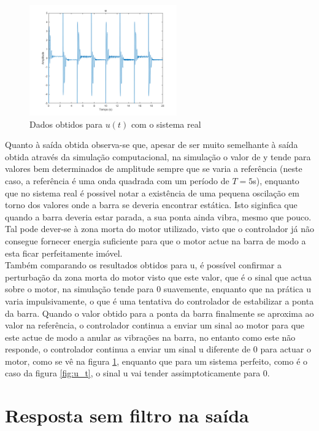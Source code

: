 \documentclass[%
  reprint,
  nofootinbib,
  amsmath,amssymb,
  aps,
  10pt,
  a4paper
]{revtex4-1}
\begin{document}
\begin{figure}[t]
\includegraphics[width=2.5in]{../img/u_dados_01.png}
\caption{Dados obtidos para $u(t)$ com o sistema real}
\label{fig:u_d}
\end{figure}

Quanto à saída obtida observa-se que, apesar de ser muito semelhante à saída obtida através da simulação computacional, na simulação o valor de y tende para valores bem determinados de amplitude sempre que se varia a referência (neste caso, a referência é uma onda quadrada com um período de $T=5$s), enquanto que no sistema real é possivel notar a existência de uma pequena oscilação em torno dos valores onde a barra se deveria encontrar estática. Isto siginfica que quando a barra deveria estar parada, a sua ponta ainda vibra, mesmo que pouco. Tal pode dever-se à zona morta do motor utilizado, visto que o controlador já não consegue fornecer energia suficiente para que o motor actue na barra de modo a esta ficar perfeitamente imóvel.\\

Também comparando os resultados obtidos para u, é possível confirmar a perturbação da zona morta do motor visto que este valor, que é o sinal que actua sobre o motor,  na simulação tende para 0 suavemente, enquanto que na prática u varia impulsivamente, o que é uma tentativa do controlador de estabilizar a ponta da barra. Quando o valor obtido para a ponta da barra finalmente se aproxima ao valor na referência, o controlador continua a enviar um sinal ao motor para que este actue de modo a anular as vibrações na barra, no entanto como este não responde, o controlador continua a enviar um sinal u diferente de 0 para actuar o motor, como se vê na figura \ref{fig:u_d}, enquanto que para um sistema perfeito, como é o caso da figura \ref{fig:u_t}, o sinal u vai tender assimptoticamente para 0.

\section{Resposta sem filtro na saída}
\end{document}

